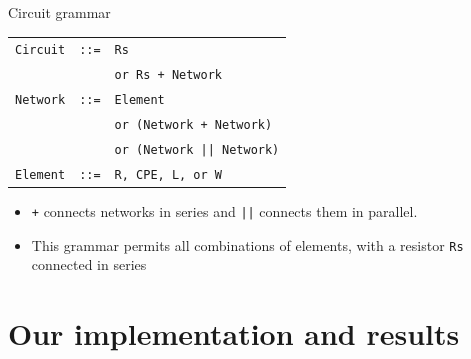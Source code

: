 \documentclass[aspectratio=169,12pt]{beamer}
\begin{document}
\begin{frame}{Circuit grammar}
  \begin{center}
    \renewcommand{\arraystretch}{1.45}
    \begin{tabular}{@{}rcl@{}}
      \texttt{Circuit} & \texttt{::=} & \texttt{Rs} \\
                       &               & \texttt{or Rs + Network} \\[0.5em]
      \texttt{Network} & \texttt{::=} & \texttt{Element} \\
                       &               & \texttt{or (Network + Network)} \\
                       &               & \texttt{or (Network || Network)} \\[0.5em]
      \texttt{Element} & \texttt{::=} & \texttt{R, CPE, L, or W} \\
    \end{tabular}
  \end{center}

  \vspace{0.7em}
  \begin{itemize}
    \setlength{\itemsep}{0.5em}
    \item \texttt{+} connects networks in series and \texttt{||} connects them in parallel.
    \item This grammar permits all combinations of elements, 
    with a resistor \texttt{Rs} connected in series
  \end{itemize}
\end{frame}

\section{Our implementation and results}
\end{document}
